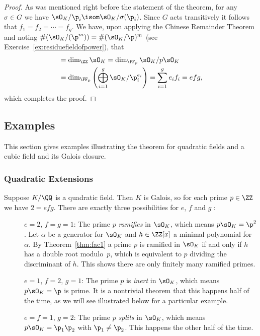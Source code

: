 \begin{proof}
  As was mentioned right before the statement of the theorem,
  for any $\sigma\in G$ we have $\sO_K/\p_i\isom \sO_K/\sigma(\p_i)$.
  Since $G$ acts transitively it follows that $f_1=f_2=\cdots = f_g$.
  We have, upon applying the Chinese Remainder Theorem
  and noting $\#(\sO_K/(\p^m)) = \#(\sO_K/\p)^m$
  (see Exercise~\ref{ex:residuefieldofpower}), that
  \begin{align*}
    [K:\QQ] & = \dim_{\ZZ} \sO_K = \dim_{\FF_p} \sO_K/p\sO_K                 \\
            & = \dim_{\FF_p} \left(\bigoplus_{i=1}^g \sO_K/\p_i^{e_i}\right)
    = \sum_{i=1}^g e_i f_i
    = efg,
  \end{align*}
  which completes the proof.
\end{proof}

\subsection{Examples}

This section gives examples illustrating the theorem for quadratic fields
and a cubic field and its Galois closure.

\subsubsection{Quadratic Extensions}

Suppose $K/\QQ$ is a quadratic field.
Then $K$ is Galois, so for each prime $p\in\ZZ$ we have $2 = efg$.
There are exactly three possibilities for $e$, $f$ and $g$ :
\begin{description}
  \item[] $e=2$, $f=g=1$: The prime $p$ \emph{ramifies} in
        $\sO_K$, which means $p\sO_K = \p^2$.  Let $\alpha$ be a generator for $\sO_K$ and
        $h \in \ZZ[x]$ a minimal polynomial for $\alpha$.
        By Theorem~\ref{thm:fac1} a prime $p$ is ramified in $\sO_K$ if and only if
        $h$ has a double root modulo~$p$, which is equivalent to $p$ dividing
        the discriminant of $h$. This shows there are only finitely many ramified
        primes.

  \item[] $e=1$, $f=2$, $g=1$: The prime $p$ is \emph{inert} in $\sO_K$,
        which means $p\sO_K = \p$ is prime.  It is a nontrivial theorem that
        this happens half of the time,
        as we will see illustrated below for a particular example.

  \item[] $e=f=1$, $g=2$: The prime $p$ \emph{splits} in $\sO_K$,
        which means $p\sO_K = \p_1\p_2$ with $\p_1\neq \p_2$.  This happens the other
        half of the time.
\end{description}

